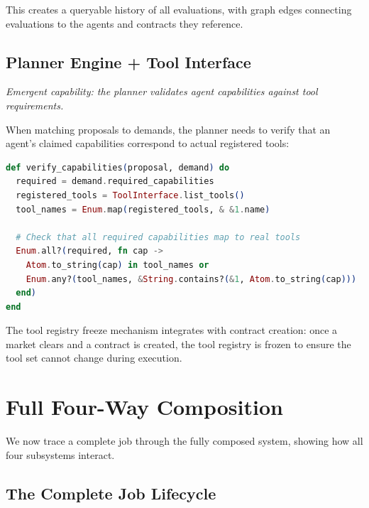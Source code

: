\documentclass[12pt,a4paper]{article}
\theoremstyle{definition}
\begin{document}
This creates a queryable history of all evaluations, with graph edges
connecting evaluations to the agents and contracts they reference.

\subsection{Planner Engine + Tool Interface}\label{subsec:planner-tool}

\emph{Emergent capability: the planner validates agent capabilities against tool requirements.}

When matching proposals to demands, the planner needs to verify that an
agent's claimed capabilities correspond to actual registered tools:

\begin{lstlisting}[language=elixir, caption={Capability verification during matching}]
def verify_capabilities(proposal, demand) do
  required = demand.required_capabilities
  registered_tools = ToolInterface.list_tools()
  tool_names = Enum.map(registered_tools, & &1.name)

  # Check that all required capabilities map to real tools
  Enum.all?(required, fn cap ->
    Atom.to_string(cap) in tool_names or
    Enum.any?(tool_names, &String.contains?(&1, Atom.to_string(cap)))
  end)
end
\end{lstlisting}

The tool registry freeze mechanism integrates with contract creation:
once a market clears and a contract is created, the tool registry is frozen
to ensure the tool set cannot change during execution.


\section{Full Four-Way Composition}\label{sec:full-composition}

We now trace a complete job through the fully composed system, showing how
all four subsystems interact.

\subsection{The Complete Job Lifecycle}
\end{document}
